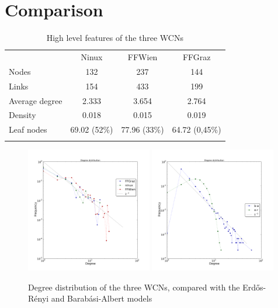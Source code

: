 \documentclass[a4paper,11pt,twoside,openleft]{memoir}
\begin{document}
\clearpage
\section{Comparison}\label{comparison}

\begin{table}
  \centering
  \begin{tabular}{@{}lccc@{}}
    \toprule\addlinespace
    & Ninux & FFWien & FFGraz
    \\\addlinespace
    \midrule
    Nodes & 132 & 237 & 144
    \\\addlinespace
    Links & 154 & 433 & 199
    \\\addlinespace
    Average degree & 2.333 & 3.654 & 2.764
    \\\addlinespace
    Density & 0.018 & 0.015 & 0.019
    \\\addlinespace
    Leaf nodes & 69.02 (52\%) & 77.96 (33\%) & 64.72 (0,45\%)
    \\\addlinespace
    \bottomrule
    \addlinespace
  \end{tabular}
  \caption{High level features of the three WCNs}
\end{table}

\begin{figure}[hbt]
  \centering
  \hspace*{\fill}
  \includegraphics[width=0.49\textwidth]{graphs/degree_distribution_wcn.pdf}
  \hfill
  \includegraphics[width=0.49\textwidth]{graphs/degree_distribution_syn.pdf}
  \hspace*{\fill}
  \caption{Degree distribution of the three WCNs, compared with the
    Erd\H{o}s-Rényi and Barabási-Albert models}
  \label{fig:wcn-degree-distribution}
\end{figure}
\end{document}
